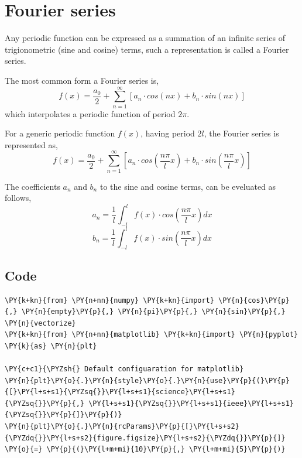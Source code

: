     
    
    

    
    \hypertarget{fourier-series}{%
\section{Fourier series}\label{fourier-series}}

    Any periodic function can be expressed as a summation of an infinite
series of trigionometric (sine and cosine) terms, such a representation
is called a Fourier series.

The most common form a Fourier series is,
\[f(x) = \frac{a_0}{2} + \sum_{n=1}^\infty \left[ a_n \cdot cos(nx) + b_n \cdot sin(nx) \right]\]
which interpolates a periodic function of period \(2\pi\).

For a generic periodic function \(f(x)\), having period \(2l\), the
Fourier series is represented as,
\[f(x) = \frac{a_0}{2} + \sum_{n=1}^\infty \left[ a_n \cdot cos\left(\frac{n\pi}{l} x\right) + b_n \cdot sin\left(\frac{n\pi}{l} x\right) \right]\]

    The coefficients \(a_n\) and \(b_n\) to the sine and cosine terms, can
be eveluated as follows,
\[a_n = \frac{1}{l} \int_{-l}^{l} f(x) \cdot cos\left(\frac{n\pi}{l} x\right) dx\]
\[b_n = \frac{1}{l} \int_{-l}^{l} f(x) \cdot sin\left(\frac{n\pi}{l} x\right) dx\]

    \hypertarget{code}{%
\subsection{Code}\label{code}}

    \begin{tcolorbox}[breakable, size=fbox, boxrule=1pt, pad at break*=1mm,colback=cellbackground, colframe=cellborder]
\begin{Verbatim}[commandchars=\\\{\}]
\PY{k+kn}{from} \PY{n+nn}{numpy} \PY{k+kn}{import} \PY{n}{cos}\PY{p}{,} \PY{n}{empty}\PY{p}{,} \PY{n}{pi}\PY{p}{,} \PY{n}{sin}\PY{p}{,} \PY{n}{vectorize}
\PY{k+kn}{from} \PY{n+nn}{matplotlib} \PY{k+kn}{import} \PY{n}{pyplot} \PY{k}{as} \PY{n}{plt}

\PY{c+c1}{\PYZsh{} Default configuaration for matplotlib}
\PY{n}{plt}\PY{o}{.}\PY{n}{style}\PY{o}{.}\PY{n}{use}\PY{p}{(}\PY{p}{[}\PY{l+s+s1}{\PYZsq{}}\PY{l+s+s1}{science}\PY{l+s+s1}{\PYZsq{}}\PY{p}{,} \PY{l+s+s1}{\PYZsq{}}\PY{l+s+s1}{ieee}\PY{l+s+s1}{\PYZsq{}}\PY{p}{]}\PY{p}{)}
\PY{n}{plt}\PY{o}{.}\PY{n}{rcParams}\PY{p}{[}\PY{l+s+s2}{\PYZdq{}}\PY{l+s+s2}{figure.figsize}\PY{l+s+s2}{\PYZdq{}}\PY{p}{]} \PY{o}{=} \PY{p}{(}\PY{l+m+mi}{10}\PY{p}{,} \PY{l+m+mi}{5}\PY{p}{)}
\end{Verbatim}
\end{tcolorbox}

